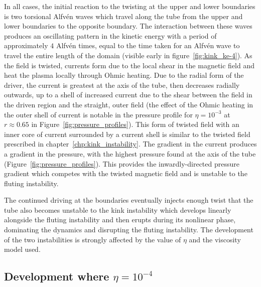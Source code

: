 In all cases, the initial reaction to the twisting at the upper and lower boundaries is two torsional Alfv\'en waves which travel along the tube from the upper and lower boundaries to the opposite boundary. The interaction between these waves produces an oscillating pattern in the kinetic energy with a period of approximately $4$ Alfv\'en times, equal to the time taken for an Alfv\'en wave to travel the entire length of the domain (visible early in figure~\ref{fig:kink_ke-4}). As the field is twisted, currents form due to the local shear in the magnetic field and heat the plasma locally through Ohmic heating. Due to the radial form of the driver, the current is greatest at the axis of the tube, then decreases radially outwards, up to a shell of increased current due to the shear between the field in the driven region and the straight, outer field (the effect of the Ohmic heating in the outer shell of current is notable in the pressure profile for $\eta=10^{-3}$ at $r\approx0.65$ in Figure~\ref{fig:pressure_profiles}). This form of twisted field with an inner core of current surrounded by a current shell is similar to the twisted field prescribed in chapter~\ref{chp:kink_instability}. The gradient in the current produces a gradient in the pressure, with the highest pressure found at the axis of the tube (Figure~\ref{fig:pressure_profiles}). This provides the inwardly-directed pressure gradient which competes with the twisted magnetic field and is unstable to the fluting instability.

The continued driving at the boundaries eventually injects enough twist that the tube also becomes unstable to the kink instability which develops linearly alongside the fluting instability and then erupts during its nonlinear phase, dominating the dynamics and disrupting the fluting instability. The development of the two instabilities is strongly affected by the value of $\eta$ and the viscosity model used.

\subsection{Development where $\eta=10^{-4}$}

